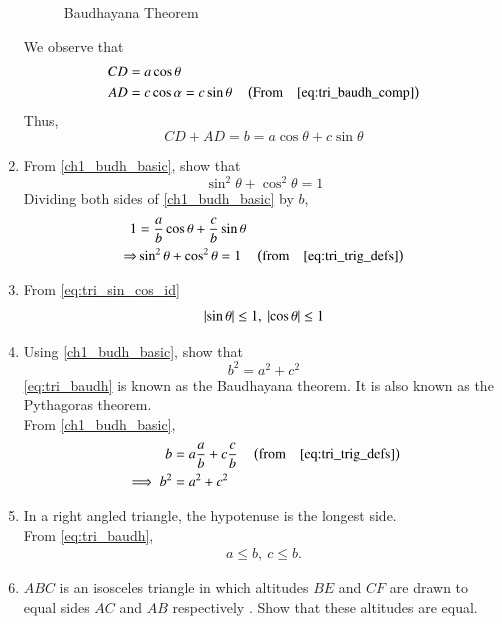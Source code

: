 \begin{enumerate}[label=\thesubsection.\arabic*.,ref=\thesubsection.\theenumi]
\begin{figure}[!ht]
\begin{center}
	\end{center}
	\caption{Baudhayana Theorem}
	\label{fig:tri_baudh}	
\end{figure}
\solution We observe that
%
\begin{align}
CD &= a \cos \theta \\
AD &= c \cos\alpha = c \sin \theta \quad \left(\text{From} \quad 
	\eqref{eq:tri_baudh_comp}	
\right)
\end{align}
%
Thus,
\begin{equation}
CD + AD = b = a \cos \theta + c \sin \theta
\end{equation}
\item
From \eqref{ch1_budh_basic}, show that
%
\begin{equation}
%
\label{eq:tri_sin_cos_id}
\sin ^2 \theta + \cos ^2 \theta = 1
\end{equation}
%
\solution Dividing both sides of \eqref{ch1_budh_basic} by $b$, 
\begin{align}
1 &= \frac{a}{b}\cos\theta + \frac{c}{b}\sin\theta\\
\Rightarrow &\sin ^2 \theta + \cos ^2 \theta = 1 \quad \left(\text{from} \quad \eqref{eq:tri_trig_defs}\right)
\end{align}
%
\item 
From \eqref{eq:tri_sin_cos_id}
\begin{align}
\label{eq:tri_sin_cos_minmax}
	\left\vert\sin \theta\right\vert \le 1,\
	\left\vert\cos \theta\right\vert \le 1
\end{align}
\item
	Using \eqref{ch1_budh_basic}, show that
	\begin{equation}
	\label{eq:tri_baudh}
	b^2 = a^2 + c^2
	\end{equation}
	\eqref{eq:tri_baudh} is known as the Baudhayana theorem.  It is also known as the Pythagoras theorem.
\\
\solution From \eqref{ch1_budh_basic},
\begin{align}
b &= a\frac{a}{b} + c \frac{c}{b} \quad \left(\text{from} \quad \eqref{eq:tri_trig_defs}\right)\\
\implies b^2 &= a^2 + c^2
\end{align}
%
\item In a right angled triangle, the hypotenuse is the longest side.
\label{them:hyp_largest}
\\
\solution From 
	\eqref{eq:tri_baudh},
\begin{align}
	a \le b,\ c \le b.
\end{align}
\item $ABC$ is an isosceles triangle in which altitudes $BE$ and $CF$ are drawn to equal sides $AC$ and $AB$ respectively . Show that these altitudes are equal.

\end{enumerate}
